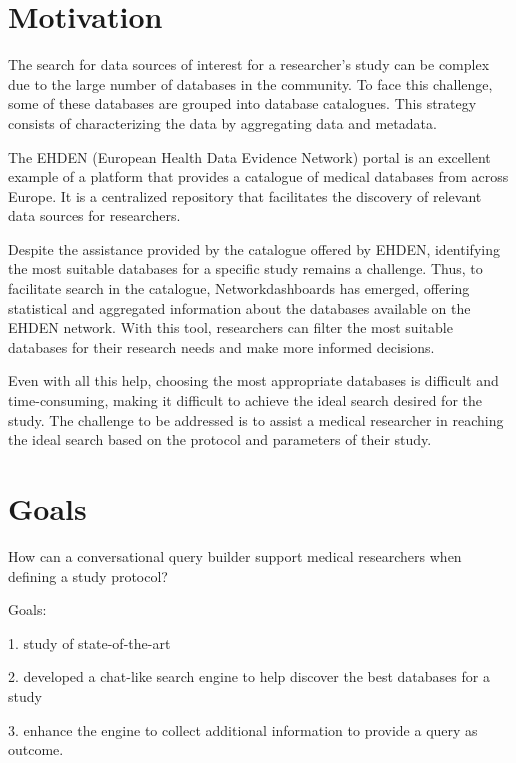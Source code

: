 \section{Motivation}

The search for data sources of interest for a researcher’s study can be complex due to the large number of databases in the community. To face this challenge, some of these databases are grouped into database catalogues. This strategy consists of characterizing the data by aggregating data and metadata.

The EHDEN (European Health Data Evidence Network) portal is an excellent example of a platform that provides a catalogue of medical databases from across Europe. It is a centralized repository that facilitates the discovery of relevant data sources for researchers.

Despite the assistance provided by the catalogue offered by EHDEN, identifying the most suitable databases for a specific study remains a challenge. Thus, to facilitate search in the catalogue, Networkdashboards has emerged, offering statistical and aggregated information about the databases available on the EHDEN network. With this tool, researchers can filter the most suitable databases for their research needs and make more informed decisions.

Even with all this help, choosing the most appropriate databases is difficult and time-consuming, making it difficult to achieve the ideal search desired for the study. The challenge to be addressed is to assist a medical researcher in reaching the ideal search based on the protocol and parameters of their study.


\section{Goals}

How can a conversational query builder support medical researchers when defining a study protocol?

Goals:

1. study of state-of-the-art

2. developed a chat-like search engine to help discover the best databases for a study

3. enhance the engine to collect additional information to provide a query as outcome.




